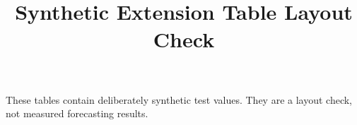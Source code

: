 \documentclass[conference]{IEEEtran}
\begin{document}
\title{Synthetic Extension Table Layout Check}
\author{}
\maketitle
These tables contain deliberately synthetic test values. They are a layout check, not measured forecasting results.



\end{document}
